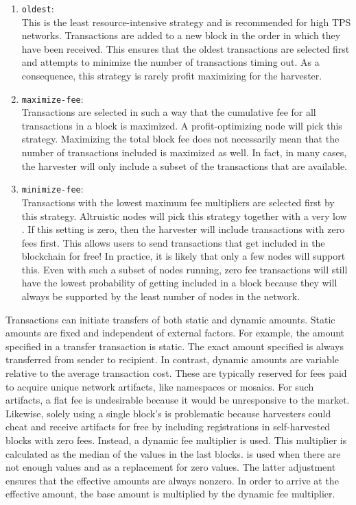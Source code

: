 \begin{enumerate}
	\item{\texttt{oldest}: \\
		This is the least resource-intensive strategy and is recommended for high TPS networks.
		Transactions are added to a new block in the order in which they have been received.
		This ensures that the oldest transactions are selected first and attempts to minimize the number of transactions timing out.
		As a consequence, this strategy is rarely profit maximizing for the harvester.
	}
	\item{\texttt{maximize-fee}: \\
		Transactions are selected in such a way that the cumulative fee for all transactions in a block is maximized.
		A profit-optimizing node will pick this strategy.
		Maximizing the total block fee does not necessarily mean that the number of transactions included is maximized as well.
		In fact, in many cases, the harvester will only include a subset of the transactions that are available.
	}
	\item{\texttt{minimize-fee}: \\
		Transactions with the lowest maximum fee multipliers are selected first by this strategy.
		Altruistic nodes will pick this strategy together with a very low .
		If this setting is zero, then the harvester will include transactions with zero fees first.
		This allows users to send transactions that get included in the blockchain for free!
		In practice, it is likely that only a few nodes will support this.
		Even with such a subset of nodes running, zero fee transactions will still have the lowest probability of getting included in a block because they will always be supported by the least number of nodes in the network.
	}
\end{enumerate}

Transactions can initiate transfers of both static and dynamic amounts.
Static amounts are fixed and independent of external factors.
For example, the amount specified in a transfer transaction is static.
The exact amount specified is always transferred from sender to recipient.
In contrast, dynamic amounts are variable relative to the average transaction cost.
These are typically reserved for fees paid to acquire unique network artifacts, like namespaces or mosaics.
For such artifacts, a flat fee is undesirable because it would be unresponsive to the market.
Likewise, solely using a single block's  is problematic because harvesters could cheat and receive artifacts for free by including registrations in self-harvested blocks with zero fees.
Instead, a dynamic fee multiplier is used.
This multiplier is calculated as the median of the  values in the last  blocks.
 is used when there are not enough values and as a replacement for zero values.
The latter adjustment ensures that the effective amounts are always nonzero.
In order to arrive at the effective amount, the base amount is multiplied by the dynamic fee multiplier.

